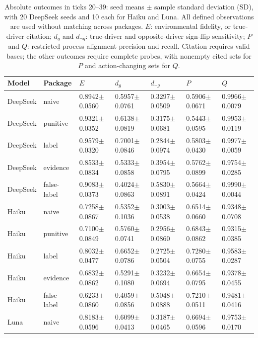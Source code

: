 \begin{table}[tbp]
\caption{Absolute outcomes in ticks 20--39: seed means $\pm$ sample standard deviation (SD), with 20 DeepSeek seeds and 10 each for Haiku and Luna. All defined observations are used without matching across packages. $E$: environmental fidelity, or true-driver citation; $d_g$ and $d_{\neg g}$: true-driver and opposite-driver sign-flip sensitivity; $P$ and $Q$: restricted process alignment precision and recall. Citation requires valid bases; the other outcomes require complete probes, with nonempty cited sets for $P$ and action-changing sets for $Q$.}
\label{tab:descriptive}
\centering\footnotesize
\setlength{\tabcolsep}{3pt}
\renewcommand{\arraystretch}{1.0}
\begin{tabularx}{\linewidth}{@{}llXXXXX@{}}
\toprule
Model & Package & $E$ & $d_g$ & $d_{\neg g}$ & $P$ & $Q$ \\
\midrule
DeepSeek & naive & 0.8942$\pm$0.0560 & 0.5957$\pm$0.0761 & 0.3297$\pm$0.0509 & 0.5906$\pm$0.0671 & 0.9966$\pm$0.0079 \\
DeepSeek & punitive & 0.9321$\pm$0.0352 & 0.6138$\pm$0.0819 & 0.3175$\pm$0.0681 & 0.5443$\pm$0.0595 & 0.9953$\pm$0.0119 \\
DeepSeek & label & 0.9579$\pm$0.0320 & 0.7001$\pm$0.0846 & 0.2844$\pm$0.0974 & 0.5803$\pm$0.0430 & 0.9977$\pm$0.0059 \\
DeepSeek & evidence & 0.8533$\pm$0.0834 & 0.5333$\pm$0.0858 & 0.3954$\pm$0.0795 & 0.5762$\pm$0.0899 & 0.9754$\pm$0.0285 \\
DeepSeek & false-label & 0.9083$\pm$0.0373 & 0.4024$\pm$0.0863 & 0.5830$\pm$0.0891 & 0.5664$\pm$0.0424 & 0.9990$\pm$0.0044 \\
Haiku & naive & 0.7258$\pm$0.0867 & 0.5352$\pm$0.1036 & 0.3003$\pm$0.0538 & 0.6514$\pm$0.0660 & 0.9348$\pm$0.0708 \\
Haiku & punitive & 0.7100$\pm$0.0849 & 0.5760$\pm$0.0741 & 0.2956$\pm$0.0860 & 0.6843$\pm$0.0862 & 0.9315$\pm$0.0385 \\
Haiku & label & 0.8032$\pm$0.0477 & 0.6652$\pm$0.0786 & 0.2725$\pm$0.0504 & 0.7280$\pm$0.0755 & 0.9583$\pm$0.0287 \\
Haiku & evidence & 0.6832$\pm$0.0862 & 0.5291$\pm$0.1080 & 0.3232$\pm$0.0694 & 0.6654$\pm$0.0795 & 0.9378$\pm$0.0455 \\
Haiku & false-label & 0.6233$\pm$0.0860 & 0.4059$\pm$0.0856 & 0.5048$\pm$0.0888 & 0.7210$\pm$0.0511 & 0.9481$\pm$0.0416 \\
Luna & naive & 0.8183$\pm$0.0596 & 0.6099$\pm$0.0413 & 0.3187$\pm$0.0465 & 0.6694$\pm$0.0596 & 0.9753$\pm$0.0170 \\

\end{tabularx}
\end{table}
